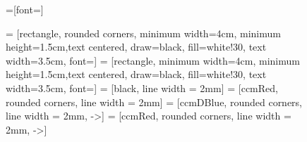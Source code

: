 \begin{figure}[!htb]
    \centering
    =[font=\large]
    
     = [rectangle, rounded corners, minimum width=4cm, minimum height=1.5cm,text centered, draw=black, fill=white!30, text width=3.5cm, font=\large]
     = [rectangle, minimum width=4cm, minimum height=1.5cm,text centered, draw=black, fill=white!30, text width=3.5cm, font=\Large]
    \tikzstyle{--} = [black, line width = 2mm]
     = [ccmRed, rounded corners, line width = 2mm]
     = [ccmDBlue, rounded corners, line width = 2mm, ->]
     = [ccmRed, rounded corners, line width = 2mm, ->]
    
    
    \setlength{\fboxsep}{0pt}%
    \setlength{\fboxrule}{1mm}

\end{figure}
